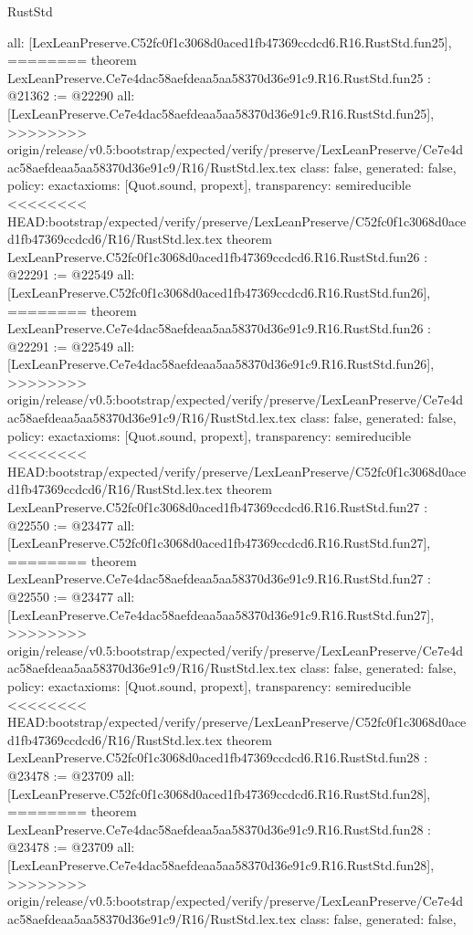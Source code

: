 \begin{lexlean}{RustStd}
\begin{coremodule}
{\begin{coremodule}
{{{{{{{{{{{{{{{{{{{{{{{{{{{{  all: [LexLeanPreserve.C52fc0f1c3068d0aced1fb47369ccdcd6.R16.RustStd.fun25],
========
theorem LexLeanPreserve.Ce7e4dac58aefdeaa5aa58370d36e91c9.R16.RustStd.fun25 : @21362 := @22290 {
  all: [LexLeanPreserve.Ce7e4dac58aefdeaa5aa58370d36e91c9.R16.RustStd.fun25],
>>>>>>>> origin/release/v0.5:bootstrap/expected/verify/preserve/LexLeanPreserve/Ce7e4dac58aefdeaa5aa58370d36e91c9/R16/RustStd.lex.tex
  class: false,
  generated: false,
  policy: exact{axioms: [Quot.sound, propext]},
  transparency: semireducible
}
<<<<<<<< HEAD:bootstrap/expected/verify/preserve/LexLeanPreserve/C52fc0f1c3068d0aced1fb47369ccdcd6/R16/RustStd.lex.tex
theorem LexLeanPreserve.C52fc0f1c3068d0aced1fb47369ccdcd6.R16.RustStd.fun26 : @22291 := @22549 {
  all: [LexLeanPreserve.C52fc0f1c3068d0aced1fb47369ccdcd6.R16.RustStd.fun26],
========
theorem LexLeanPreserve.Ce7e4dac58aefdeaa5aa58370d36e91c9.R16.RustStd.fun26 : @22291 := @22549 {
  all: [LexLeanPreserve.Ce7e4dac58aefdeaa5aa58370d36e91c9.R16.RustStd.fun26],
>>>>>>>> origin/release/v0.5:bootstrap/expected/verify/preserve/LexLeanPreserve/Ce7e4dac58aefdeaa5aa58370d36e91c9/R16/RustStd.lex.tex
  class: false,
  generated: false,
  policy: exact{axioms: [Quot.sound, propext]},
  transparency: semireducible
}
<<<<<<<< HEAD:bootstrap/expected/verify/preserve/LexLeanPreserve/C52fc0f1c3068d0aced1fb47369ccdcd6/R16/RustStd.lex.tex
theorem LexLeanPreserve.C52fc0f1c3068d0aced1fb47369ccdcd6.R16.RustStd.fun27 : @22550 := @23477 {
  all: [LexLeanPreserve.C52fc0f1c3068d0aced1fb47369ccdcd6.R16.RustStd.fun27],
========
theorem LexLeanPreserve.Ce7e4dac58aefdeaa5aa58370d36e91c9.R16.RustStd.fun27 : @22550 := @23477 {
  all: [LexLeanPreserve.Ce7e4dac58aefdeaa5aa58370d36e91c9.R16.RustStd.fun27],
>>>>>>>> origin/release/v0.5:bootstrap/expected/verify/preserve/LexLeanPreserve/Ce7e4dac58aefdeaa5aa58370d36e91c9/R16/RustStd.lex.tex
  class: false,
  generated: false,
  policy: exact{axioms: [Quot.sound, propext]},
  transparency: semireducible
}
<<<<<<<< HEAD:bootstrap/expected/verify/preserve/LexLeanPreserve/C52fc0f1c3068d0aced1fb47369ccdcd6/R16/RustStd.lex.tex
theorem LexLeanPreserve.C52fc0f1c3068d0aced1fb47369ccdcd6.R16.RustStd.fun28 : @23478 := @23709 {
  all: [LexLeanPreserve.C52fc0f1c3068d0aced1fb47369ccdcd6.R16.RustStd.fun28],
========
theorem LexLeanPreserve.Ce7e4dac58aefdeaa5aa58370d36e91c9.R16.RustStd.fun28 : @23478 := @23709 {
  all: [LexLeanPreserve.Ce7e4dac58aefdeaa5aa58370d36e91c9.R16.RustStd.fun28],
>>>>>>>> origin/release/v0.5:bootstrap/expected/verify/preserve/LexLeanPreserve/Ce7e4dac58aefdeaa5aa58370d36e91c9/R16/RustStd.lex.tex
  class: false,
  generated: false,
}}}}}}}}}}}}}}}}}}}}}}}}}}}}}}}}
\end{coremodule}}
\end{coremodule}
\end{lexlean}

